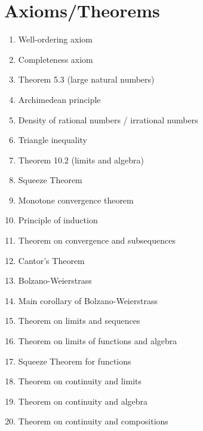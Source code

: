 \documentclass[12pt]{amsart}
\begin{document}
\section*{Axioms/Theorems}

\begin{enumerate}
	\item Well-ordering axiom
	\item Completeness axiom

	\item Theorem 5.3 (large natural numbers)
	\item Archimedean principle
	\item Density of rational numbers / irrational numbers
	\item Triangle inequality

	\item Theorem 10.2 (limits and algebra)

	\item Squeeze Theorem
	\item Monotone convergence theorem

	\item Principle of induction
					
	\item Theorem on convergence and subsequences
	\item Cantor's Theorem

	\item Bolzano-Weierstrass

	\item Main corollary of Bolzano-Weierstrass
	

	\item Theorem on limits and sequences
	\item Theorem on limits of functions and algebra
	\item Squeeze Theorem for functions


	\item Theorem on continuity and limits
	
	\item Theorem on continuity and algebra
	\item Theorem on continuity and compositions
		\begin{comment}
		\item Intermediate Value Theorem
	\item Boundedness Theorem
	\item Extreme Value Theorem
	

	\item Derivatives and algebra (Theorem 32.9)
	\item Chain rule (Theorem 33.3)
		\item Min-Max Theorem
	\item Mean Value Theorem
	\item Increasing/decreasing functions and derivatives
\end{comment}
\end{enumerate}
\end{document}
